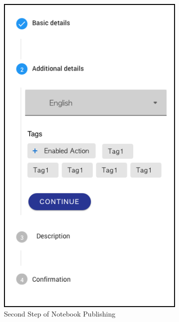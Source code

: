 \documentclass[thesis=B,english]{FITthesis}[2012/10/20]
\begin{document}
\begin{figure}
\begin{subfigure}{.5\textwidth}
  \includegraphics[scale=0.4]{step2}
  \caption{Second Step of Notebook Publishing }
  \label{fig:step2}
\end{subfigure}
\begin{subfigure}{.5\textwidth}
  \centering

\end{subfigure}
\end{figure}
\end{document}
